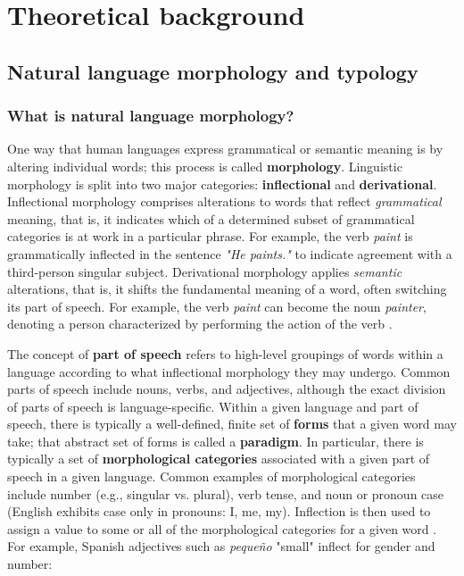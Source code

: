 \chapter{Theoretical background}

\section{Natural language morphology and typology}

\subsection{What is natural language morphology?}

One way that human languages express grammatical or semantic meaning is by altering individual words; this process is called \textbf{morphology}. Linguistic morphology is split into two major categories: \textbf{inflectional} and \textbf{derivational}. Inflectional morphology comprises alterations to words that reflect \textit{grammatical} meaning, that is, it indicates which of a determined subset of grammatical categories is at work in a particular phrase. For example, the verb \textit{paint} is grammatically inflected in the sentence \textit{"He paints."} to indicate agreement with a third-person singular subject. Derivational morphology applies \textit{semantic} alterations, that is, it shifts the fundamental meaning of a word, often switching its part of speech. For example, the verb \textit{paint} can become the noun \textit{painter}, denoting a person characterized by performing the action of the verb \parencite{Hogan2010}. 

The concept of \textbf{part of speech} refers to high-level groupings of words within a language according to what inflectional morphology they may undergo. Common parts of speech include nouns, verbs, and adjectives, although the exact division of parts of speech is language-specific. Within a given language and part of speech, there is typically a well-defined, finite set of \textbf{forms} that a given word may take; that abstract set of forms is called a \textbf{paradigm}. In particular, there is typically a set of \textbf{morphological categories} associated with a given part of speech in a given language. Common examples of morphological categories include number (e.g., singular vs. plural), verb tense, and noun or pronoun case (English exhibits case only in pronouns: I, me, my). Inflection is then used to assign a value to some or all of the morphological categories for a given word \parencite{Hogan2010}. For example, Spanish adjectives such as \textit{pequeño} "small" inflect for gender and number:

